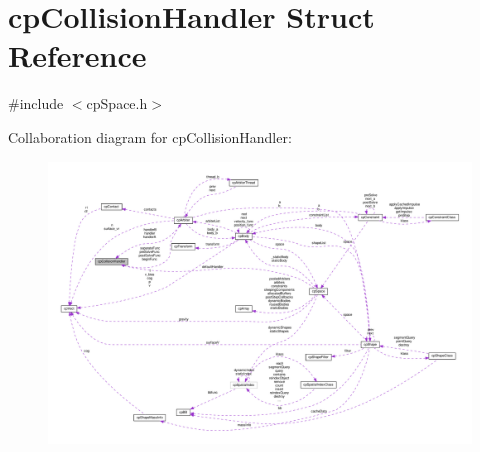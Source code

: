 \hypertarget{structcpCollisionHandler}{}\section{cp\+Collision\+Handler Struct Reference}
\label{structcpCollisionHandler}


{\ttfamily \#include $<$cp\+Space.\+h$>$}



Collaboration diagram for cp\+Collision\+Handler\+:
\nopagebreak
\begin{figure}[H]
\begin{center}
\leavevmode
\includegraphics[width=350pt]{structcpCollisionHandler__coll__graph}
\end{center}
\end{figure}
